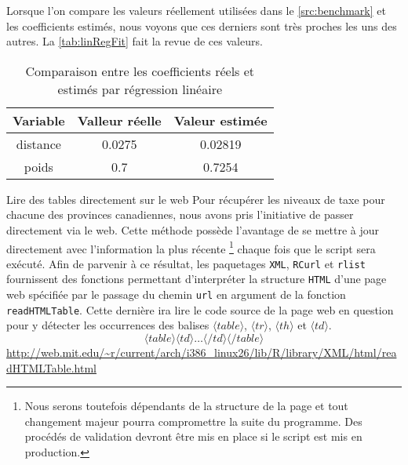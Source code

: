 Lorsque l'on compare les valeurs réellement utilisées dans le \autoref{src:benchmark} et les coefficients estimés, nous voyons que ces derniers sont très proches les uns des autres. La \autoref{tab:linRegFit} fait la revue de ces valeurs. \\

\begin{table}[h]
	\centering
	\begin{tabular}{ccc}
		\textbf{Variable} & \textbf{Valleur réelle} & \textbf{Valeur estimée} \\
		\hline
		distance & 0.0275 & 0.02819 \\
		poids & 0.7 & 0.7254		
	\end{tabular}
	\caption{Comparaison entre les coefficients réels et estimés par régression linéaire}
	\label{tab:linRegFit}
\end{table}

\begin{moreInfo}{Lire des tables directement sur le web}
	Pour récupérer les niveaux de taxe pour chacune des provinces canadiennes, nous avons pris l'initiative de passer directement via le web. Cette méthode possède l'avantage de se mettre à jour directement avec l'information la plus récente \footnote{Nous serons toutefois dépendants de la structure de la page et tout changement majeur pourra compromettre la suite du programme. Des procédés de validation devront être mis en place si le script est mis en production.} chaque fois que le script sera exécuté. Afin de parvenir à ce résultat, les paquetages \texttt{XML}, \texttt{RCurl} et \texttt{rlist} fournissent des fonctions permettant d'interpréter la structure \texttt{HTML} d'une page web spécifiée par le passage du chemin \texttt{url} en argument de la fonction \texttt{readHTMLTable}. Cette dernière ira lire le code source de la page web en question pour y détecter les occurrences des balises $\langle table \rangle$, $\langle tr \rangle$, $\langle th \rangle$ et $\langle td \rangle$.  $$\langle table \rangle \langle td \rangle \dots \langle /td \rangle \langle /table \rangle$$
	\url{http://web.mit.edu/~r/current/arch/i386_linux26/lib/R/library/XML/html/readHTMLTable.html}
\end{moreInfo}